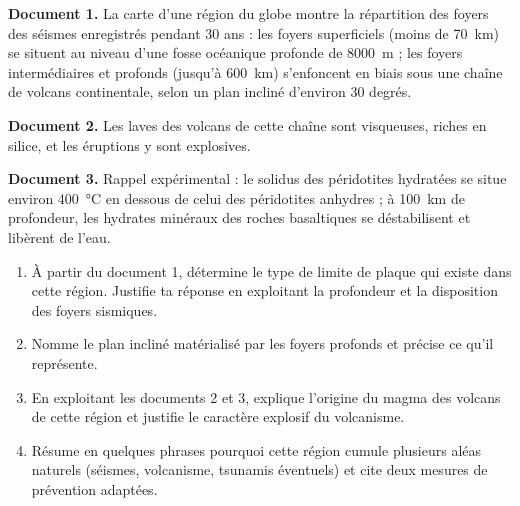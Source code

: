 \documentclass[11pt]{article}
\begin{document}
\begin{exercice}
\textbf{Document 1.} La carte d'une région du globe montre la répartition des foyers des séismes enregistrés pendant 30 ans : les foyers superficiels (moins de \SI{70}{km}) se situent au niveau d'une fosse océanique profonde de \SI{8000}{m} ; les foyers intermédiaires et profonds (jusqu'à \SI{600}{km}) s'enfoncent en biais sous une chaîne de volcans continentale, selon un plan incliné d'environ 30 degrés.

\textbf{Document 2.} Les laves des volcans de cette chaîne sont visqueuses, riches en silice, et les éruptions y sont explosives.

\textbf{Document 3.} Rappel expérimental : le solidus des péridotites hydratées se situe environ \SI{400}{\celsius} en dessous de celui des péridotites anhydres ; à \SI{100}{km} de profondeur, les hydrates minéraux des roches basaltiques se déstabilisent et libèrent de l'eau.

\begin{enumerate}
\item À partir du document 1, détermine le type de limite de plaque qui existe dans cette région. Justifie ta réponse en exploitant la profondeur et la disposition des foyers sismiques.
\item Nomme le plan incliné matérialisé par les foyers profonds et précise ce qu'il représente.
\item En exploitant les documents 2 et 3, explique l'origine du magma des volcans de cette région et justifie le caractère explosif du volcanisme.
\item Résume en quelques phrases pourquoi cette région cumule plusieurs aléas naturels (séismes, volcanisme, tsunamis éventuels) et cite deux mesures de prévention adaptées.
\end{enumerate}
\end{exercice}
\end{document}
